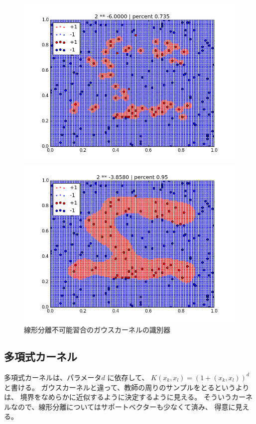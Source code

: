 \documentclass[]{jsarticle}
\begin{document}
\begin{figure}[htbp]
 \begin{minipage}[b]{0.5\hsize}
  \includegraphics[scale=0.4]{./cross_validate_images/gauss_te/1.png}
 \end{minipage}
 \begin{minipage}[b]{0.5\hsize}
  \includegraphics[scale=0.4]{./cross_validate_images/gauss_te/4.png}
 \end{minipage}
 \caption{線形分離不可能習合のガウスカーネルの識別器}
\end{figure}

\newpage
\subsection{多項式カーネル}
多項式カーネルは、パラメータ$d$ に依存して、
$K(x_k,x_l) = (1+(x_k,x_l))^d $ と書ける。
ガウスカーネルと違って、教師の周りのサンプルをとるというよりは、
境界をなめらかに近似するように決定するように見える。
そういうカーネルなので、線形分離についてはサポートベクターも少なくて済み、
得意に見える。
\end{document}
